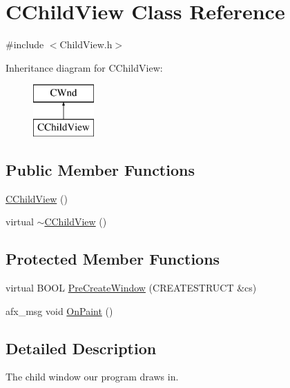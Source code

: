 \hypertarget{class_c_child_view}{}\section{C\+Child\+View Class Reference}
\label{class_c_child_view}


{\ttfamily \#include $<$Child\+View.\+h$>$}

Inheritance diagram for C\+Child\+View\+:\begin{figure}[H]
\begin{center}
\leavevmode
\includegraphics[height=2.000000cm]{class_c_child_view}
\end{center}
\end{figure}
\subsection*{Public Member Functions}
\begin{DoxyCompactItemize}
\item 
\mbox{\hyperlink{class_c_child_view_aff5af7c162c10755edbe58f260ded6d4}{C\+Child\+View}} ()
\item 
virtual \mbox{\hyperlink{class_c_child_view_a5b033b5e0a130950719a173b86418698}{$\sim$\+C\+Child\+View}} ()
\end{DoxyCompactItemize}
\subsection*{Protected Member Functions}
\begin{DoxyCompactItemize}
\item 
virtual B\+O\+OL \mbox{\hyperlink{class_c_child_view_a07e87a6c3606422ff10d45a47d702c7e}{Pre\+Create\+Window}} (C\+R\+E\+A\+T\+E\+S\+T\+R\+U\+CT \&cs)
\item 
afx\+\_\+msg void \mbox{\hyperlink{class_c_child_view_a8ea6d42631a4f9f446923ff864b239ab}{On\+Paint}} ()
\end{DoxyCompactItemize}


\subsection{Detailed Description}
The child window our program draws in. 

